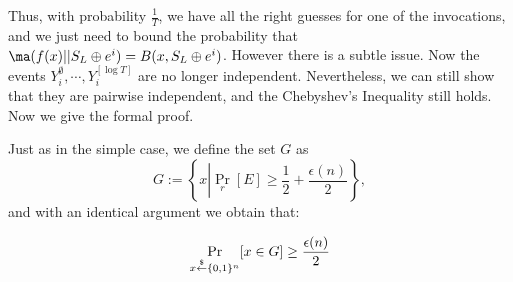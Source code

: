 Thus, with probability $\frac{1}{T}$, we have all the right guesses for one of the invocations, and we just need to bound the probability that $\ma(f(x) || S_L \oplus e^i) = B(x, S_L \oplus e^i)$.
However there is a subtle issue. Now the events $Y_i^\emptyset, \cdots, Y_i^{[\log T]}$ are no longer independent.
Nevertheless, we can still show that they are pairwise independent, and the Chebyshev's Inequality still holds. Now we give the formal proof.

Just as in the simple case, we define the set $G$ as
$$G := \left\{x \left| \Pr_r \left[ E \right]\geq \frac{1}{2} + \frac{\epsilon(n)}{2} \right. \right\},$$
and with an identical argument we obtain that:

$$\Pr_{x \stackrel{\$}{\leftarrow} \{0,1\}^{n}}[x \in G] \geq \frac{\epsilon(n)}{2}$$



